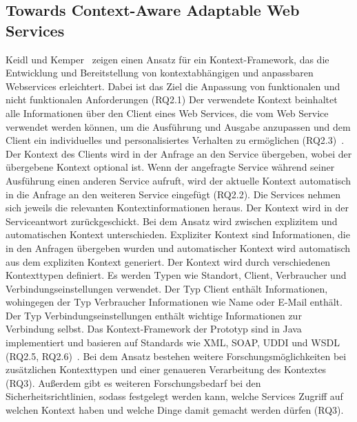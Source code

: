 \documentclass[conference,compsoc]{IEEEtran}
\begin{document}
\subsection{Towards Context-Aware Adaptable Web Services}
Keidl und Kemper~\cite{keidl2004towards} zeigen einen Ansatz für ein Kontext-Framework, das die Entwicklung und Bereitstellung von kontextabhängigen und anpassbaren Webservices erleichtert. Dabei ist das Ziel die Anpassung von funktionalen und nicht funktionalen Anforderungen (RQ2.1)
Der verwendete Kontext beinhaltet alle Informationen über den Client eines Web Services, die vom Web Service verwendet werden können, um die Ausführung und Ausgabe anzupassen und dem Client ein individuelles und personalisiertes Verhalten zu ermöglichen (RQ2.3)~\cite{keidl2004towards}. Der Kontext des Clients wird in der Anfrage an den Service übergeben, wobei der übergebene Kontext optional ist. Wenn der angefragte Service während seiner Ausführung einen anderen Service aufruft, wird der aktuelle Kontext automatisch in die Anfrage an den weiteren Service eingefügt (RQ2.2). Die Services nehmen sich jeweils die relevanten Kontextinformationen heraus. Der Kontext wird in der Serviceantwort zurückgeschickt.
Bei dem Ansatz wird zwischen explizitem und automatischen Kontext unterschieden. Expliziter Kontext sind Informationen, die in den Anfragen übergeben wurden und automatischer Kontext wird automatisch aus dem expliziten Kontext generiert.
Der Kontext wird durch verschiedenen Kontexttypen definiert. Es werden Typen wie Standort, Client, Verbraucher und Verbindungseinstellungen verwendet. Der Typ Client enthält Informationen, wohingegen der Typ Verbraucher Informationen wie Name oder E-Mail enthält. Der Typ Verbindungseinstellungen enthält wichtige Informationen zur Verbindung selbst.
Das Kontext-Framework der Prototyp sind in Java implementiert und basieren auf Standards wie XML, SOAP, UDDI und WSDL (RQ2.5, RQ2.6)~\cite{keidl2004towards}.
Bei dem Ansatz bestehen weitere Forschungsmöglichkeiten bei zusätzlichen Kontexttypen und einer genaueren Verarbeitung des Kontextes (RQ3). Außerdem gibt es weiteren Forschungsbedarf bei den Sicherheitsrichtlinien, sodass festgelegt werden kann, welche Services Zugriff auf welchen Kontext haben und welche Dinge damit gemacht werden dürfen (RQ3).
\end{document}
